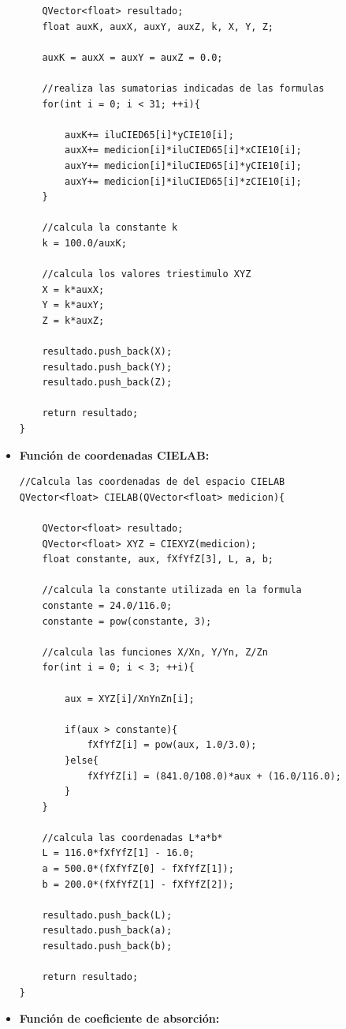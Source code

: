 \begin{itemize}
\begin{lstlisting}
    QVector<float> resultado;
    float auxK, auxX, auxY, auxZ, k, X, Y, Z;

    auxK = auxX = auxY = auxZ = 0.0;

    //realiza las sumatorias indicadas de las formulas
    for(int i = 0; i < 31; ++i){

		auxK+= iluCIED65[i]*yCIE10[i];
        auxX+= medicion[i]*iluCIED65[i]*xCIE10[i];
        auxY+= medicion[i]*iluCIED65[i]*yCIE10[i];
        auxY+= medicion[i]*iluCIED65[i]*zCIE10[i];
    }

    //calcula la constante k
    k = 100.0/auxK;

    //calcula los valores triestimulo XYZ
    X = k*auxX;
    Y = k*auxY;
    Z = k*auxZ;

    resultado.push_back(X);
    resultado.push_back(Y);
    resultado.push_back(Z);

    return resultado;
}
			\end{lstlisting}

\newpage
		
		\item \textbf{Funci\'{o}n de coordenadas CIELAB:}
			\begin{lstlisting}
//Calcula las coordenadas de del espacio CIELAB
QVector<float> CIELAB(QVector<float> medicion){
    
    QVector<float> resultado;
    QVector<float> XYZ = CIEXYZ(medicion);
    float constante, aux, fXfYfZ[3], L, a, b;

    //calcula la constante utilizada en la formula
    constante = 24.0/116.0;
    constante = pow(constante, 3);

    //calcula las funciones X/Xn, Y/Yn, Z/Zn
    for(int i = 0; i < 3; ++i){

        aux = XYZ[i]/XnYnZn[i];

        if(aux > constante){
            fXfYfZ[i] = pow(aux, 1.0/3.0);
        }else{
            fXfYfZ[i] = (841.0/108.0)*aux + (16.0/116.0);
        }
    }

    //calcula las coordenadas L*a*b*
    L = 116.0*fXfYfZ[1] - 16.0;
    a = 500.0*(fXfYfZ[0] - fXfYfZ[1]);
    b = 200.0*(fXfYfZ[1] - fXfYfZ[2]);

    resultado.push_back(L);
    resultado.push_back(a);
    resultado.push_back(b);

    return resultado;
}
			\end{lstlisting}

\newpage		
		
		\item \textbf{Funci\'{o}n de coeficiente de absorci\'{o}n:}
		

\end{itemize}
